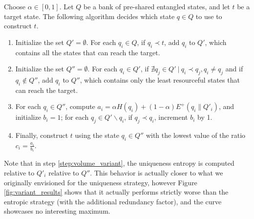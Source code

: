\begin{appendix_definition} \label{strat:uniqueness_variant}
    Choose $\alpha \in [0, 1]$. Let $Q$ be a bank of pre-shared entangled states, and let $t$ be a target state. The following algorithm decides which state $q \in Q$ to use to construct $t$.
    \begin{enumerate}
        \item Initialize the set $Q' = \emptyset$. For each $q_i \in Q$, if $q_i \prec t$, add $q_i$ to $Q'$, which contains all the states that can reach the target.
        \item Initialize the set $Q'' = \emptyset$. For each $q_i \in Q'$, if $\nexists q_j \in Q' \: | \: q_i \prec q_j, q_i \neq q_j$ and if $q_i \notin Q''$, add $q_i$ to $Q''$, which contains only the least resourceful states that can reach the target.
        \item For each $q_i \in Q''$, compute $a_i = \alpha H(q_i) + (1 - \alpha) E^+(q_i \parallel Q'_i)$, and initialize $b_i = 1$; for each $q_j \in Q' \backslash q_i$, if $q_j \prec q_i$, increment $b_i$ by 1. \label{step:volume_variant}
        \item Finally, construct $t$ using the state $q_i \in Q''$ with the lowest value of the ratio $c_i = \frac{a_i}{b_i}$.
    \end{enumerate}
\end{appendix_definition}

Note that in step \ref{step:volume_variant}, the uniqueness entropy is computed relative to $Q'_i$ relative to $Q''$. This behavior is actually closer to what we originally envisioned for the uniqueness strategy, however Figure \ref{fig:variant_results} shows that it actually performs strictly worse than the entropic strategy (with the additional redundancy factor), and the curve showcases no interesting maximum.

